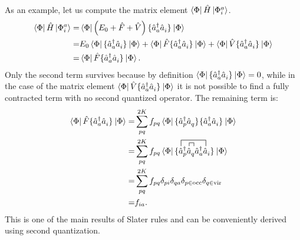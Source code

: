 \documentclass[../Main/chem532-notes.tex]{subfiles}
\begin{document}
As an example, let us compute the matrix element $\bra{\Phi} \hat{H} \ket{\Phi_{i}^{a}}$.
\begin{equation}
\begin{split}
\bra{\Phi} \hat{H} \ket{\Phi_{i}^{a}} 
=& \bra{\Phi} \left( E_0 + \hat{F} + \hat{V}\right) \{{\hat{a}_{a}^{\dagger} \hat{a}_{i}^{\,}}\}_{} \ket{\Phi} \\
=& E_0 \bra{\Phi}\{{\hat{a}_{a}^{\dagger} \hat{a}_{i}^{\,}}\}_{} \ket{\Phi}
+ \bra{\Phi}\hat{F}\{{\hat{a}_{a}^{\dagger} \hat{a}_{i}^{\,}}\}_{} \ket{\Phi}
+ \bra{\Phi}\hat{V}\{{\hat{a}_{a}^{\dagger} \hat{a}_{i}^{\,}}\}_{} \ket{\Phi} \\
=& \bra{\Phi}\hat{F}\{{\hat{a}_{a}^{\dagger} \hat{a}_{i}^{\,}}\}_{} \ket{\Phi}.
\end{split}
\end{equation}
Only the second term survives because by definition $\bra{\Phi}\{{\hat{a}_{a}^{\dagger} \hat{a}_{i}^{\,}}\}_{} \ket{\Phi} = 0$, while in the case of the matrix element $\bra{\Phi}\hat{V}\{{\hat{a}_{a}^{\dagger} \hat{a}_{i}^{\,}}\}_{} \ket{\Phi}$ it is not possible to find a fully contracted term with no second quantized operator. 
The remaining term is:
\begin{equation}
\begin{split}
\bra{\Phi}\hat{F}\no{\cop{a} \aop{i}} \ket{\Phi} =&
\sum_{pq}^{2K} f_{pq} 
\bra{\Phi}\no{\cop{p} \aop{q}}\no{\cop{a} \aop{i}} \ket{\Phi} \\
=&
\sum_{pq}^{2K} f_{pq} 
\bra{\Phi}\no{
\contraction[1.75ex]{}{\hat{a}}{_{p}\aop{q}\cop{a}}{\hat{a}}
\contraction{\cop{p}}{\hat{a}}{}{\hat{a}}
\cop{p} \aop{q}\cop{a} \aop{i}} \ket{\Phi}\\
=&
\sum_{pq}^{2K} f_{pq} 
\delta_{pi} \delta_{qa} \delta_{p\in\mathrm{occ}}\delta_{q\in\mathrm{vir}}\\
=& f_{ia}.
\end{split}
\end{equation}
This is one of the main results of Slater rules and can be conveniently derived using second quantization.
\end{document}
